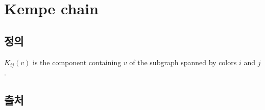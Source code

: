 \section{Kempe chain}

\subsection*{정의}
$K_{ij}(v)$ is the component containing $v$ of the subgraph spanned by colors $i$ and $j$.

\subsection*{출처}
\cite{sample2020kempe,grey2006reducible}
